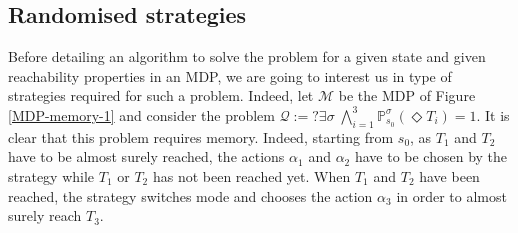 \subsection{Randomised strategies} \label{randomised-strategies}
Before detailing an algorithm to solve the \MOSR{} problem for a given state and given reachability properties in an MDP, we are going to interest us in type of strategies required for such a problem.
Indeed, let $\mathcal{M}$ be the MDP of Figure \ref{MDP-memory-1} and consider the \MOSR{} problem $\mathcal{Q}:= ?\exists \sigma \; \bigwedge_{i=1}^3 \mathbb{P}^\sigma_{s_0}(\Diamond T_i) = 1$.
It is clear that this problem requires memory.
Indeed, starting from $s_0$, as $T_1$ and $T_2$ have to be almost surely reached, the actions $\alpha_1$ and $\alpha_2$ have to be chosen by the strategy while $T_1$ or $T_2$ has not been reached yet.
When $T_1$ and $T_2$ have been reached, the strategy switches mode and chooses the action $\alpha_3$ in order to almost surely reach $T_3$.
